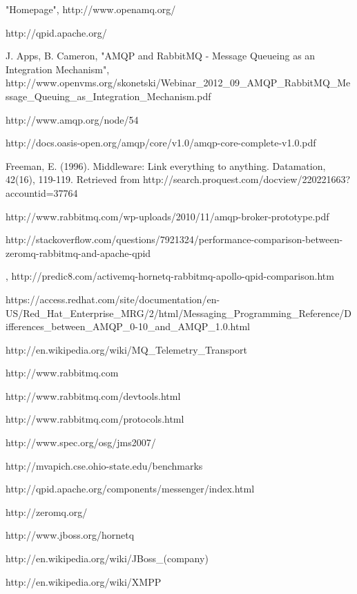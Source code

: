 \documentclass{thesis}
\begin{document}
\begin{singlespace}
\begin{thebibliography}{99}
 "Homepage", http://www.openamq.org/

 http://qpid.apache.org/

 J. Apps, B. Cameron, "AMQP and RabbitMQ - Message Queueing as an Integration Mechanism", http://www.openvms.org/skonetski/Webinar\_2012\_09\_AMQP\_RabbitMQ\_Message\_Queuing\_as\_Integration\_Mechanism.pdf

 http://www.amqp.org/node/54

 http://docs.oasis-open.org/amqp/core/v1.0/amqp-core-complete-v1.0.pdf

 Freeman, E. (1996). Middleware: Link everything to anything. Datamation, 42(16), 119-119. Retrieved from http://search.proquest.com/docview/220221663?accountid=37764

 http://www.rabbitmq.com/wp-uploads/2010/11/amqp-broker-prototype.pdf

 http://stackoverflow.com/questions/7921324/performance-comparison-between-zeromq-rabbitmq-and-apache-qpid

 , http://predic8.com/activemq-hornetq-rabbitmq-apollo-qpid-comparison.htm

 https://access.redhat.com/site/documentation/en-US/Red\_Hat\_Enterprise\_MRG/2/html/Messaging\_Programming\_Reference/Differences\_between\_AMQP\_0-10\_and\_AMQP\_1.0.html

 http://en.wikipedia.org/wiki/MQ\_Telemetry\_Transport

 http://www.rabbitmq.com

 http://www.rabbitmq.com/devtools.html

 http://www.rabbitmq.com/protocols.html

 http://www.spec.org/osg/jms2007/

 http://mvapich.cse.ohio-state.edu/benchmarks

 http://qpid.apache.org/components/messenger/index.html

 http://zeromq.org/

 http://www.jboss.org/hornetq

 http://en.wikipedia.org/wiki/JBoss\_(company)

 http://en.wikipedia.org/wiki/XMPP


\end{thebibliography}
\end{singlespace}
\end{document}
